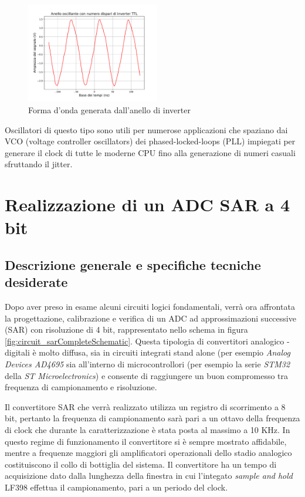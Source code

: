 \documentclass[journal]{IEEEtran}
\begin{document}
\begin{figure}[H]%
\begin{center}
\includegraphics[width=0.52\textwidth]{analysis/output/oscillating-ring.pdf}
\caption{Forma d'onda generata dall'anello di inverter}
\label{fig:graph_ring_oscillator}
\end{center}
\end{figure}


Oscillatori di questo tipo sono utili per numerose applicazioni che spaziano dai VCO (voltage controller oscillators) dei phased-locked-loops (PLL) impiegati per generare il clock di tutte le moderne CPU fino alla generazione di numeri casuali sfruttando il jitter.


\section{Realizzazione di un ADC SAR a 4 bit}

\subsection{Descrizione generale e specifiche tecniche desiderate}
Dopo aver preso in esame alcuni circuiti logici fondamentali, verrà ora affrontata la progettazione, calibrazione e verifica di un ADC ad approssimazioni successive (SAR) con risoluzione di 4 bit, rappresentato nello schema in figura \ref{fig:circuit_sarCompleteSchematic}. Questa tipologia di convertitori analogico - digitali è molto diffusa, sia in circuiti integrati stand alone (per esempio \textit{Analog Devices AD4695} sia all'interno di microcontrollori (per esempio la serie \textit{STM32} della \textit{ST Microelectronics}) e consente di raggiungere un buon compromesso tra frequenza di campionamento e risoluzione.

Il convertitore SAR che verrà realizzato utilizza un registro di scorrimento a 8 bit, pertanto la frequenza di campionamento sarà pari a un ottavo della frequenza di clock che durante la caratterizzazione è stata posta al massimo a 10 KHz. In questo regime di funzionamento il convertitore si è sempre mostrato affidabile, mentre a frequenze maggiori gli amplificatori operazionali dello stadio analogico costituiscono il collo di bottiglia del sistema. Il convertitore ha un tempo di acquisizione dato dalla lunghezza della finestra in cui l'integato \textit{sample and hold} LF398 effettua il campionamento, pari a un periodo del clock.
\end{document}
